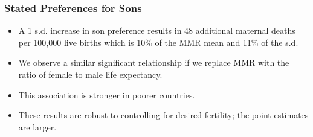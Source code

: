 \documentclass[9pt,letterpaper,subeqn]{beamer}
\begin{document}
\begin{frame}
\frametitle{Stated Preferences for Sons}
\begin{itemize}
	\item A 1 s.d. increase in son preference results in 48 additional maternal deaths per 100,000 live births which is 10\% of the MMR mean and 11\% of the s.d.
	\item We observe a similar significant relationship if we replace MMR with the ratio of female to male life expectancy.
	\item This association is stronger in poorer countries. %
	\item These results are robust to controlling for desired fertility; the point estimates are larger.
		

\end{itemize}
\end{frame}
\end{document}
